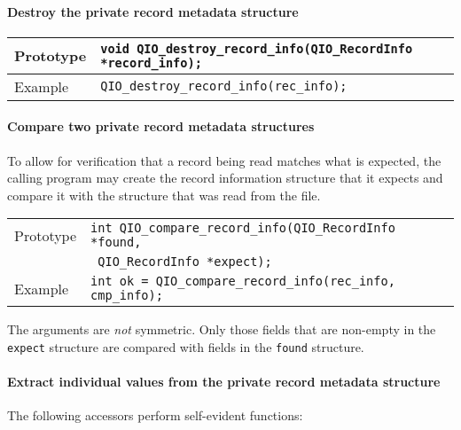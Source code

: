 \documentclass{article}
\begin{document}
\paragraph{Destroy the private record metadata structure}
%
\begin{flushleft}
  \begin{tabular}{|l|l|}
  \hline
  Prototype      & \verb|void QIO_destroy_record_info(QIO_RecordInfo *record_info);| \\
\hline
  Example  & \verb|QIO_destroy_record_info(rec_info);|\\
   \hline
 \end{tabular}
\end{flushleft}
%

\paragraph{Compare two private record metadata structures}
To allow for verification that a record being read matches what is
expected, the calling program may create the record information
structure that it expects and compare it with the structure that
was read from the file.

%
\begin{flushleft}
  \begin{tabular}{|l|l|}
  \hline
  Prototype      & \verb|int QIO_compare_record_info(QIO_RecordInfo *found,|\\
                 & \verb| QIO_RecordInfo *expect);| \\
\hline
  Example  & \verb|int ok = QIO_compare_record_info(rec_info, cmp_info);|\\
   \hline
 \end{tabular}
\end{flushleft}
%
The arguments are {\it not} symmetric.  Only those fields that are
non-empty in the \verb|expect| structure are compared with fields in
the \verb|found| structure.

\paragraph{Extract individual values from the private record metadata structure}
The following accessors perform self-evident functions:
\end{document}
